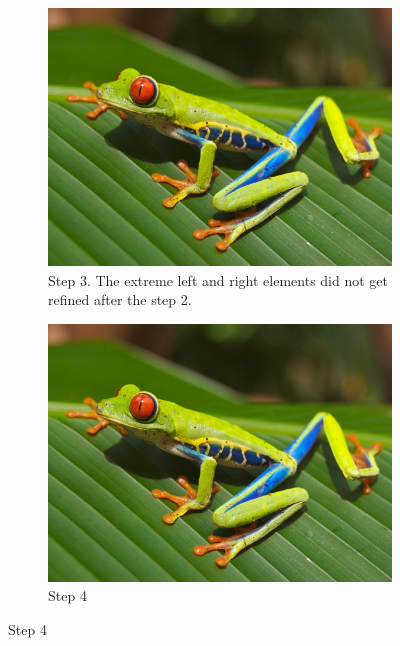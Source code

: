 \begin{figure}[H]
	\ContinuedFloat %
	\caption[Double-grid h-adaptation strategy, steps 3-4]{} %

	\begin{subfigure}[h]{1.0\textwidth}
		\centering
		\includegraphics[scale=0.2]{frog.jpg}
		\caption{
			Step 3.
			The extreme left and right elements did not get refined after the step 2.
		}
		\label{fig:h-adapt-two-grid-3}
	\end{subfigure}

	\begin{subfigure}[h]{1.0\textwidth}
		\centering
		\includegraphics[scale=0.2]{frog.jpg}
		\caption{
			Step 4
		}
		\label{fig:h-adapt-two-grid-4}
	\end{subfigure}
\end{figure}


